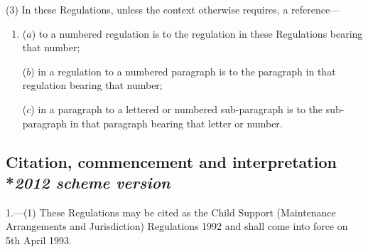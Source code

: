 \documentclass[12pt,a4paper]{article}
\begin{document}
(3) In these Regulations, unless the context otherwise requires, a reference—
\begin{enumerate}\item[]
($a$) to a numbered regulation is to the regulation in these Regulations bearing that number;

($b$) in a regulation to a numbered paragraph is to the paragraph in that regulation bearing that number;

($c$) in a paragraph to a lettered or numbered sub-paragraph is to the sub-paragraph in that paragraph bearing that letter or number.
\end{enumerate}


\subsection[1. Citation, commencement and interpretation --- \emph{2012 scheme version}]{Citation, commencement and interpretation\\*\emph{2012 scheme version}}

1.—(1) These Regulations may be cited as the Child Support (Maintenance Arrangements and Jurisdiction) Regulations 1992 and shall come into force on 5th April 1993.
\end{document}
